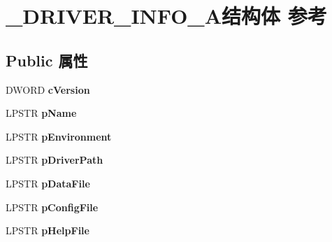 \hypertarget{struct___d_r_i_v_e_r___i_n_f_o__4_a}{}\section{\+\_\+\+D\+R\+I\+V\+E\+R\+\_\+\+I\+N\+F\+O\+\_\+A结构体 参考}
\label{struct___d_r_i_v_e_r___i_n_f_o__4_a}
\subsection*{Public 属性}
\begin{DoxyCompactItemize}
\item 
\mbox{\label{struct___d_r_i_v_e_r___i_n_f_o__4_a_a0222706e875e6cb26ab2aec26da4c117}} 
D\+W\+O\+RD {\bfseries c\+Version}
\item 
\mbox{\label{struct___d_r_i_v_e_r___i_n_f_o__4_a_a24049f98e10f6005011d22d5635fe8cd}} 
L\+P\+S\+TR {\bfseries p\+Name}
\item 
\mbox{\label{struct___d_r_i_v_e_r___i_n_f_o__4_a_a6f3911f7d52b9d7276691b4edff1fb47}} 
L\+P\+S\+TR {\bfseries p\+Environment}
\item 
\mbox{\label{struct___d_r_i_v_e_r___i_n_f_o__4_a_ae3782a9a748f04fded0cee96af869821}} 
L\+P\+S\+TR {\bfseries p\+Driver\+Path}
\item 
\mbox{\label{struct___d_r_i_v_e_r___i_n_f_o__4_a_a67fd2c3d37ef9897ff4ae0224127f96e}} 
L\+P\+S\+TR {\bfseries p\+Data\+File}
\item 
\mbox{\label{struct___d_r_i_v_e_r___i_n_f_o__4_a_a9157369a2eeefb7af2d96c47b4185417}} 
L\+P\+S\+TR {\bfseries p\+Config\+File}
\item 
\mbox{\label{struct___d_r_i_v_e_r___i_n_f_o__4_a_a8e9977eadab4ef9b46703007dc720c83}} 
L\+P\+S\+TR {\bfseries p\+Help\+File}
\item 
\mbox{\label{struct___d_r_i_v_e_r___i_n_f_o__4_a_a885f06168d38929ac562a550e96489ca}} 

\end{DoxyCompactItemize}
